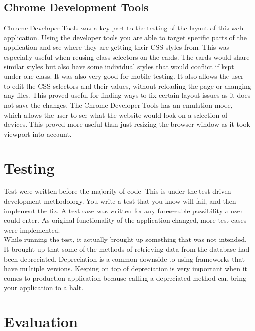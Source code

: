 \subsection{Chrome Development Tools}
Chrome Developer Tools \citep{cdt:2014} was a key part to the testing of the layout of this web application. Using the developer tools you are able to target specific parts of the application and see where they are getting their CSS styles from. This was especially useful when reusing class selectors on the cards. The cards would share similar styles but also have some individual styles that would conflict if kept under one class. It was also very good for mobile testing. It also allows the user to edit the CSS selectors and their values, without reloading the page or changing any files. This proved useful for finding ways to fix certain layout issues as it does not save the changes. The Chrome Developer Tools has an emulation mode, which allows the user to see what the website would look on a selection of devices. This proved more useful than just resizing the browser window as it took viewport into account. \\

\section{Testing}
Test were written before the majority of code. This is under the test driven development methodology. You write a test that you know will fail, and then implement the fix. A test case was written for any foreseeable possibility a user could enter. As original functionality of the application changed, more test cases were implemented.\\

While running the test, it actually brought up something that was not intended. It brought up that some of the methods of retrieving data from the database had been depreciated. Depreciation is a common downside to using frameworks that have multiple versions. Keeping on top of depreciation is very important when it comes to production application because calling a depreciated method can bring your application to a halt.

\section{Evaluation}
